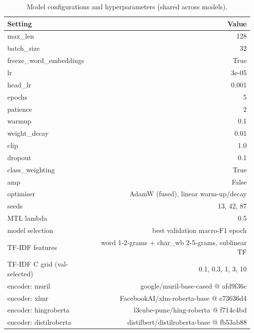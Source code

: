 \begin{table}[t]
\centering
\small
\caption{Model configurations and hyperparameters (shared across models).}
\label{tab:tab04_hyperparameters}
\begin{tabular}{lr}
\toprule
Setting & Value \\
\midrule
max\_len & 128 \\
batch\_size & 32 \\
freeze\_word\_embeddings & True \\
lr & 3e-05 \\
head\_lr & 0.001 \\
epochs & 5 \\
patience & 2 \\
warmup & 0.1 \\
weight\_decay & 0.01 \\
clip & 1.0 \\
dropout & 0.1 \\
class\_weighting & True \\
amp & False \\
optimiser & AdamW (fused), linear warm-up/decay \\
seeds & 13, 42, 87 \\
MTL lambda & 0.5 \\
model selection & best validation macro-F1 epoch \\
TF-IDF features & word 1-2-grams + char\_wb 2-5-grams, sublinear TF \\
TF-IDF C grid (val-selected) & 0.1, 0.3, 1, 3, 10 \\
encoder: muril & google/muril-base-cased @ afd9f36c \\
encoder: xlmr & FacebookAI/xlm-roberta-base @ e73636d4 \\
encoder: hingroberta & l3cube-pune/hing-roberta @ f714c4bd \\
encoder: distilroberta & distilbert/distilroberta-base @ fb53ab88 \\
\bottomrule
\end{tabular}
\end{table}

